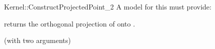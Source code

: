 \begin{ccRefFunctionObjectConcept}{Kernel::ConstructProjectedPoint_2}
A model for this must provide:


       {returns the orthogonal projection of  onto .}

\ccRefines
{} (with two arguments)

\ccSeeAlso
{} \\

\end{ccRefFunctionObjectConcept}
